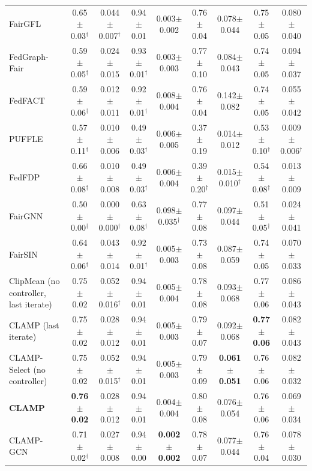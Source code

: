 \begin{table}[tbp]
{\begin{tabular}{p{2.4cm} cc cc cc cc}
\raggedright FairGFL & 0.65$\pm$0.03$^\dagger$ & 0.044$\pm$0.007$^\dagger$ & 0.94$\pm$0.01 & 0.003$\pm$0.002 & 0.76$\pm$0.04 & 0.078$\pm$0.044 & 0.75$\pm$0.05 & 0.080$\pm$0.040 \\
\raggedright FedGraph-Fair & 0.59$\pm$0.05$^\dagger$ & 0.024$\pm$0.015 & 0.93$\pm$0.01$^\dagger$ & 0.003$\pm$0.003 & 0.77$\pm$0.10 & 0.084$\pm$0.043 & 0.74$\pm$0.05 & 0.094$\pm$0.037 \\
\raggedright FedFACT & 0.59$\pm$0.06$^\dagger$ & 0.012$\pm$0.011 & 0.92$\pm$0.01$^\dagger$ & 0.008$\pm$0.004 & 0.76$\pm$0.04 & 0.142$\pm$0.082 & 0.74$\pm$0.05 & 0.055$\pm$0.042 \\
\raggedright PUFFLE & 0.57$\pm$0.11$^\dagger$ & 0.010$\pm$0.006 & 0.49$\pm$0.03$^\dagger$ & 0.006$\pm$0.005 & 0.37$\pm$0.19 & 0.014$\pm$0.012 & 0.53$\pm$0.10$^\dagger$ & 0.009$\pm$0.006$^\dagger$ \\
\raggedright FedFDP & 0.66$\pm$0.08$^\dagger$ & 0.010$\pm$0.008 & 0.49$\pm$0.03$^\dagger$ & 0.006$\pm$0.004 & 0.39$\pm$0.20$^\dagger$ & 0.015$\pm$0.010$^\dagger$ & 0.54$\pm$0.08$^\dagger$ & 0.013$\pm$0.009 \\
\raggedright FairGNN & 0.50$\pm$0.00$^\dagger$ & 0.000$\pm$0.000$^\dagger$ & 0.63$\pm$0.08$^\dagger$ & 0.098$\pm$0.035$^\dagger$ & 0.77$\pm$0.08 & 0.097$\pm$0.044 & 0.51$\pm$0.05$^\dagger$ & 0.024$\pm$0.041 \\
\raggedright FairSIN & 0.64$\pm$0.06$^\dagger$ & 0.043$\pm$0.014 & 0.92$\pm$0.01$^\dagger$ & 0.005$\pm$0.003 & 0.73$\pm$0.08 & 0.087$\pm$0.059 & 0.74$\pm$0.05 & 0.070$\pm$0.033 \\
\raggedright ClipMean (no controller, last iterate) & 0.75$\pm$0.02 & 0.052$\pm$0.016$^\dagger$ & 0.94$\pm$0.01 & 0.005$\pm$0.004 & 0.78$\pm$0.08 & 0.093$\pm$0.068 & 0.77$\pm$0.06 & 0.086$\pm$0.043 \\
\raggedright CLAMP (last iterate) & 0.75$\pm$0.02 & 0.028$\pm$0.012 & 0.94$\pm$0.01 & 0.005$\pm$0.003 & 0.79$\pm$0.07 & 0.092$\pm$0.068 & \textbf{0.77$\pm$0.06} & 0.082$\pm$0.043 \\
\raggedright CLAMP-Select (no controller) & 0.75$\pm$0.02 & 0.052$\pm$0.015$^\dagger$ & 0.94$\pm$0.01 & 0.005$\pm$0.003 & 0.79$\pm$0.09 & \textbf{0.061$\pm$0.051} & 0.76$\pm$0.06 & 0.082$\pm$0.032 \\
\raggedright \textbf{CLAMP} & \textbf{0.76$\pm$0.02} & 0.028$\pm$0.012 & 0.94$\pm$0.01 & 0.004$\pm$0.004 & 0.80$\pm$0.08 & 0.076$\pm$0.054 & 0.76$\pm$0.06 & 0.069$\pm$0.034 \\
\raggedright CLAMP-GCN & 0.71$\pm$0.02$^\dagger$ & 0.027$\pm$0.008 & 0.94$\pm$0.00 & \textbf{0.002$\pm$0.002} & 0.78$\pm$0.07 & 0.077$\pm$0.044 & 0.76$\pm$0.04 & 0.078$\pm$0.030 \\
\bottomrule
\end{tabular}}
\end{table}
